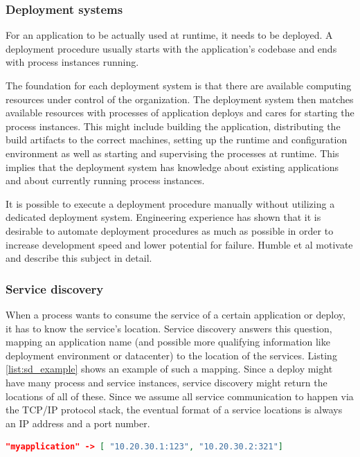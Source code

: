 \subsubsection{Deployment systems}

For an application to be actually used at runtime, it needs to be deployed. A deployment procedure usually starts with the application's codebase and ends with process instances running.

The foundation for each deployment system is that there are available computing resources under control of the organization. The deployment system then matches available resources with processes of application deploys and cares for starting the process instances. This might include building the application, distributing the build artifacts to the correct machines, setting up the runtime and configuration environment as well as starting and supervising the processes at runtime. This implies that the deployment system has knowledge about existing applications and about currently running process instances.

It is possible to execute a deployment procedure manually without utilizing a dedicated deployment system. Engineering experience has shown that it is desirable to automate deployment procedures as much as possible in order to increase development speed and lower potential for failure. Humble et al \cite{ContinuousDelivery} motivate and describe this subject in detail.

\subsubsection{Service discovery}

When a process wants to consume the service of a certain application or deploy, it has to know the service's location. Service discovery answers this question, mapping an application name (and possible more qualifying information like deployment environment or datacenter) to the location of the services. Listing \ref{list:sd_example} shows an example of such a mapping. Since a deploy might have many process and service instances, service discovery might return the locations of all of these. Since we assume all service communication to happen via the TCP/IP protocol stack, the eventual format of a service locations is always an IP address and a port number.

\begin{lstlisting}[language=json,numbers=none,caption=Example for a service discovery mapping from service discovery key to service locations with IP address and port number,label=list:sd_example,backgroundcolor=\color{white}]
"myapplication" -> [ "10.20.30.1:123", "10.20.30.2:321"]
\end{lstlisting}

